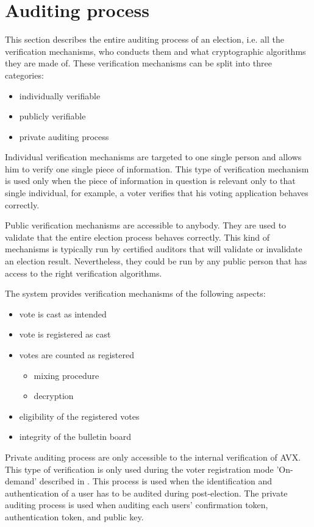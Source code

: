 \section{Auditing process} \label{sec: auditing process}
This section describes the entire auditing process of an election, i.e. all the verification mechanisms, who conducts them and what cryptographic algorithms they are made of. These verification mechanisms can be split into three categories:
\begin{itemize}
    \item individually verifiable
    \item publicly verifiable
    \item private auditing process
\end{itemize}

Individual verification mechanisms are targeted to one single person and allows him to verify one single piece of information. This type of verification mechanism is used only when the piece of information in question is relevant only to that single individual, for example, a voter verifies that his voting application behaves correctly. 

Public verification mechanisms are accessible to anybody. They are used to validate that the entire election process behaves correctly. This kind of mechanisms is typically run by certified auditors that will validate or invalidate an election result. Nevertheless, they could be run by any public person that has access to the right verification algorithms.

The system provides verification mechanisms of the following aspects:
\begin{itemize}
    \item vote is cast as intended
    \item vote is registered as cast
    \item votes are counted as registered
    \begin{itemize}
        \item mixing procedure
        \item decryption
    \end{itemize}
    \item eligibility of the registered votes
    \item integrity of the bulletin board
\end{itemize}

Private auditing process are only accessible to the internal verification of AVX. This type of verification is only used during the voter registration mode 'On-demand' described in . This process is used when the identification and authentication of a user has to be audited during post-election. The private auditing process is used when auditing each users' confirmation token, authentication token, and public key.
